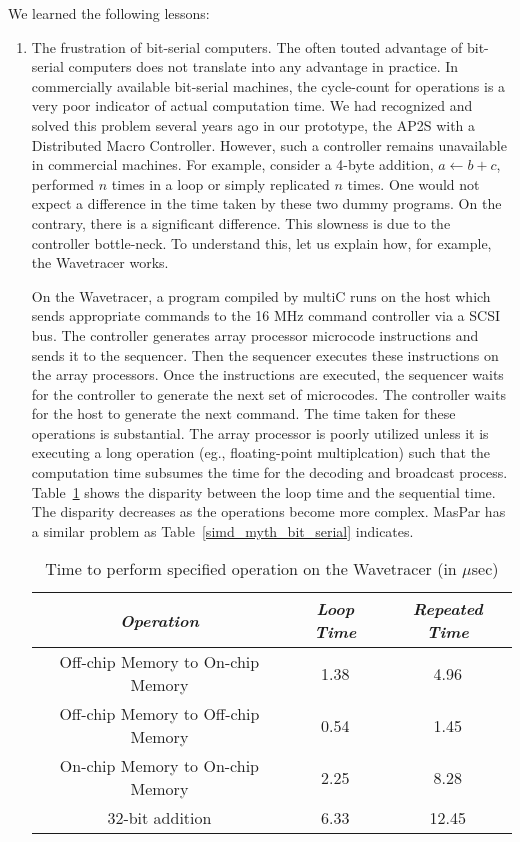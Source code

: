 We learned the following lessons:
\begin{enumerate}

\item The frustration of bit-serial computers. 
The often touted advantage of bit-serial computers does
not translate into any advantage in practice.
In commercially available bit-serial machines,
the cycle-count for operations is a very poor 
indicator of actual computation time.  We had recognized and solved 
this problem several years ago in our prototype, the AP2S \cite{rjn90}
with a Distributed Macro Controller.  However, such a controller 
remains unavailable in commercial machines.  
%
For example, consider a 4-byte addition, $a \leftarrow b + c$,
performed $n$ times in a loop or simply replicated $n$ times.
One would not expect a difference in the time taken by these
two dummy programs. On the contrary, there is a significant
difference.  This slowness is due to the controller bottle-neck.  
To understand this, let us explain how, for example, the Wavetracer works.

On the Wavetracer, a program compiled by 
multiC runs on the host which sends appropriate commands to the 
16 MHz command controller via a SCSI bus.  
The controller generates array processor microcode instructions 
and sends it to the sequencer.  Then the sequencer executes these 
instructions on the array processors.  
Once the instructions are executed, the sequencer waits for
the controller to generate the next set of microcodes. 
The controller waits for the host to generate the next command.
The time taken for these operations is substantial.
The array processor is poorly utilized unless it is executing a long
operation (eg., floating-point multiplcation) such that the 
computation time subsumes the time for the decoding and
broadcast process.
Table~\ref{wave_perform} shows the disparity
between the loop time and the sequential time. The disparity
decreases as the operations become more complex.  MasPar has
a similar problem as Table~\ref{simd_myth_bit_serial} indicates.

\begin{table}
\begin{center}
\begin{tabular}{|c|c|c|} \hline \hline
{\em Operation }	 	& {\em Loop Time } & {\em Repeated Time} \\ \hline
Off-chip Memory to On-chip Memory	&	1.38	& 4.96	\\ \hline
Off-chip Memory to Off-chip Memory	&	0.54	& 1.45	\\ \hline
On-chip Memory to On-chip Memory	&	2.25	& 8.28	\\ \hline
32-bit addition				&	6.33	& 12.45	\\ \hline \hline
\end{tabular}
\end{center}
\caption{Time to perform specified operation on the Wavetracer (in $\mu$sec)}
\label{wave_perform}
\end{table}


\end{enumerate}
